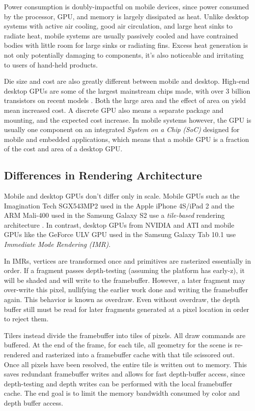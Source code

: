 Power consumption is doubly-impactful on mobile devices, since power consumed
by the processor, GPU, and memory is largely dissipated as heat.  Unlike
desktop systems with active air cooling, good air circulation, and large heat
sinks to radiate heat, mobile systems are usually passively cooled and have
contrained bodies with little room for large sinks or radiating fins.  Excess
heat generation is not only potentially damaging to components, it's also
noticeable and irritating to users of hand-held products.

Die size and cost are also greatly different between mobile and desktop.
High-end desktop GPUs are some of the largest mainstream chips made, with over
3 billion transistors on recent models \cite{Walton10}.  Both the large area
and the effect of area on yield mean increased cost.  A discrete GPU also means
a separate package and mounting, and the expected cost increase.  In mobile
systems however, the GPU is usually one component on an integrated
\textit{System on a Chip (SoC)} designed for mobile and embedded applications,
which means that a mobile GPU is a fraction of the cost and area of a desktop
GPU.

\subsection{Differences in Rendering Architecture}
\label{Jon-McCaffrey:differences-in-rendering-architecture}
  Mobile and desktop GPUs don't
differ only in scale.  Mobile GPUs such as the Imagination Tech SGX543MP2 used
in the Apple iPhone 4S/iPad 2 and the ARM Mali-400 used in the Samsung Galaxy S2
use a \textit{tile-based} rendering architecture \cite{Klug11a}.  In
contrast, desktop GPUs from NVIDIA and ATI and mobile GPUs like the
GeForce ULV GPU used in the Samsung Galaxy Tab 10.1 use \textit{Immediate Mode
Rendering (IMR)}.

In IMRs, vertices are transformed once and primitives are rasterized
essentially in order.  If a fragment passes depth-testing (assuming the
platform has early-z), it will be shaded and will write to the framebuffer.
However, a later fragment may over-write this pixel, nullifying the earlier
work done and writing the framebuffer again.  This behavior is known as overdraw.
Even without overdraw, the depth buffer still must be read for later fragments 
generated at a pixel location in order to reject them.

Tilers instead divide the framebuffer into tiles of pixels.  All draw
commands
 are buffered.  At the end of the frame, for each tile, all
geometry for the scene is re-rendered and rasterized into a framebuffer cache
with that tile scissored out.  Once all pixels have been resolved, the entire
tile is written out to memory.  This saves redundant framebuffer writes and
allows for fast depth-buffer access, since depth-testing and depth writes can
be performed with the local framebuffer cache.  The end goal is to limit the
memory bandwidth consumed by color and depth buffer access.

